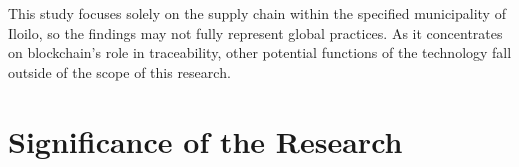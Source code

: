 \noindent This study focuses solely on the supply chain within the specified municipality of Iloilo, so the findings may not fully represent global practices. As it concentrates on blockchain's role in traceability, other potential functions of the technology fall outside of the scope of this research.


\begin{comment}
	
	Generally, one paragraph should be allotted for each of your research objectives.
	
	Each paragraph contains a brief overview of the concept/theory and the purpose of doing the associated objective.
	
	Each paragraph also includes a description of the scope/limitation of your study.
	
	* Please refer to the slides for examples.
	
\end{comment}


\section{Significance of the Research}
\label{sec:significance}

